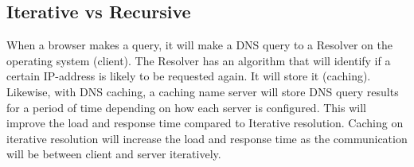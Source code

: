 \subsection{Iterative vs Recursive}

When a browser makes a query, it will make a DNS query to a Resolver on the operating system (client). The Resolver has an algorithm that will identify if a certain IP-address is likely to be requested again. It will store it (caching). 
Likewise, with DNS caching, a caching name server will store DNS query results for a period of time depending on how each server is configured. This will improve the load and response time compared to Iterative resolution. Caching on iterative resolution will increase the load and response time as the communication will be between client and server iteratively.